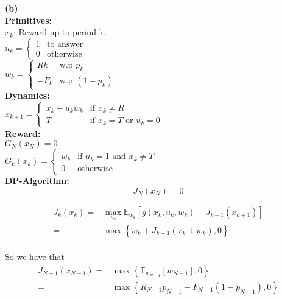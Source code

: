 \documentclass[11pt, english]{article}
\begin{document}
\textbf{(b)}\\

\textbf{Primitives:}\\

$x_k$: Reward up to period k.\\

$u_k=\left\{\begin{array}{ll}
1 & \text{to answer}\\
0 & \text{otherwise}
\end{array}\right.$\\

$w_k=\left\{\begin{array}{ll}
Rk & \text{w.p } p_k\\
-F_k & \text{w.p } (1-p_k)
\end{array}\right.$\\

\textbf{Dynamics:}\\

$x_{k + 1}=\left\{\begin{array}{ll}
x_k + u_k w_k & \text{if } x_k \neq R\\
T & \text{if } x_k = T \text{ or } u_k = 0
\end{array}\right.$\\

\textbf{Reward:}\\

$G_N(x_N) = 0$\\

$G_k(x_k)=\left\{\begin{array}{ll}
w_k & \text{if } u_k = 1 \text{ and } x_k  \neq T\\
0 & \text{otherwise }
\end{array}\right.$\\

\textbf{DP-Algorithm:}\\

\begin{equation*}
J_N(x_N) = 0
\end{equation*}

\begin{align*}
J_k(x_k) =& \max\limits_{u_k} \mathbb{E}_{w_k} \left[g(x_k, u_k, w_k) + J_{k+1}(x_{k+1})\right] \\
= & \max\left\{w_k + J_{k+1}(x_k + w_k), 0 \right\}
\end{align*}\\

So we have that
\begin{align*}
J_{N-1}(x_{N-1}) =& \max\left\{\mathbb{E}_{w_{N-1}} \left[w_{N-1}\right], 0 \right\} \\
= & \max\left\{R_{N-1} p_{N-1} - F_{N-1} (1 - p_{N-1}), 0 \right\}
\end{align*}\\
\end{document}
